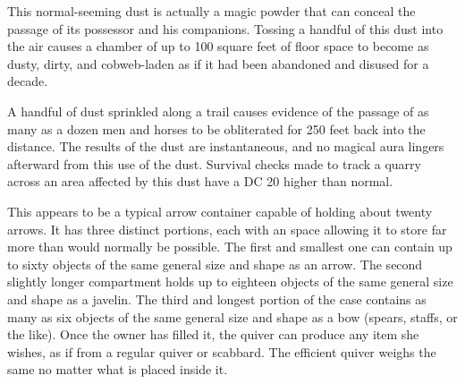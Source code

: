 {

 This normal-seeming dust is actually a magic powder that can conceal the passage of its possessor and his companions. Tossing a handful of this dust into the air causes a chamber of up to 100 square feet of floor space to become as dusty, dirty, and cobweb-laden as if it had been abandoned and disused for a decade.

A handful of dust sprinkled along a trail causes evidence of the passage of as many as a dozen men and horses to be obliterated for 250 feet back into the distance. The results of the dust are instantaneous, and no magical aura lingers afterward from this use of the dust. Survival checks made to track a quarry across an area affected by this dust have a DC 20 higher than normal.


 This appears to be a typical arrow container capable of holding about twenty arrows. It has three distinct portions, each with an  space allowing it to store far more than would normally be possible. The first and smallest one can contain up to sixty objects of the same general size and shape as an arrow. The second slightly longer compartment holds up to eighteen objects of the same general size and shape as a javelin. The third and longest portion of the case contains as many as six objects of the same general size and shape as a bow (spears, staffs, or the like). Once the owner has filled it, the quiver can produce any item she wishes, as if from a regular quiver or scabbard. The efficient quiver weighs the same no matter what is placed inside it.


\begin{comment}
Efreeti Bottle:} This item is typically fashioned of brass or bronze, with a lead stopper bearing special seals. A thin stream of smoke is often seen issuing from it. The bottle can be opened once per day. When opened, the efreeti imprisoned within issues from the bottle instantly. There is a 10\% chance (01?10 on d\%) that the efreeti is insane and attacks immediately upon being released. There is also a 10\% chance (91?100) that the efreeti of the bottle grants three wishes. In either case, the efreeti afterward disappears forever. The other 80\% of the time (11?90), the inhabitant of the bottle loyally serves the character for up to 10 minutes per day (or until the efreeti's death), doing as she commands. Roll each day the bottle is opened for that day's effect.


\end{comment}}
